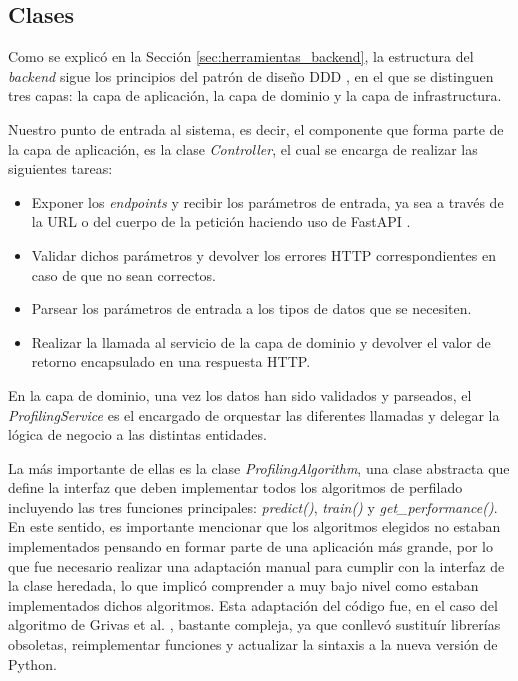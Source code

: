 \subsection{Clases}

\bigskip
Como se explicó en la Sección \ref{sec:herramientas_backend}, la estructura del \textit{backend} sigue los principios
del patrón de diseño DDD \cite{ddd}, en el que se distinguen tres capas: la capa de aplicación, la capa de dominio
y la capa de infrastructura.

\bigskip
Nuestro punto de entrada al sistema, es decir, el componente que forma parte de la capa de aplicación, es la clase
\textit{Controller}, el cual se encarga de realizar las siguientes tareas:

\begin{itemize}
	\item Exponer los \textit{endpoints} y recibir los parámetros de entrada, ya sea a través de la URL o del cuerpo de la petición
	haciendo uso de FastAPI \cite{fastapi}.
	\item Validar dichos parámetros y devolver los errores HTTP correspondientes en caso de que no sean correctos.
	\item Parsear los parámetros de entrada a los tipos de datos que se necesiten.
	\item Realizar la llamada al servicio de la capa de dominio y devolver el valor de retorno encapsulado en una respuesta HTTP.
\end{itemize}

\bigskip
En la capa de dominio, una vez los datos han sido validados y parseados, el \textit{ProfilingService} es el encargado de orquestar
las diferentes llamadas y delegar la lógica de negocio a las distintas entidades.

\bigskip
La más importante de ellas es la clase \textit{ProfilingAlgorithm},
una clase abstracta que define la interfaz que deben implementar todos los algoritmos de perfilado incluyendo las tres funciones principales:
\textit{predict()}, \textit{train()} y \textit{get\_performance()}. En este sentido, es importante mencionar que los algoritmos elegidos no estaban implementados
pensando en formar parte de una aplicación más grande, por lo que fue necesario realizar una adaptación manual para cumplir con la interfaz de
la clase heredada, lo que implicó comprender a muy bajo nivel como estaban implementados dichos algoritmos. Esta adaptación del código fue, en el caso del algoritmo de Grivas et al. \cite{grivas2015author}, 
bastante compleja, ya que conllevó sustituír librerías obsoletas, reimplementar funciones y actualizar la sintaxis a la nueva versión de Python.


